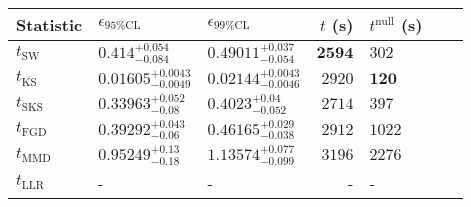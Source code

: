 \begin{tabular}{l|llr|llr}
	Statistic & $\epsilon_{95\%\mathrm{CL}}$ & $\epsilon_{99\%\mathrm{CL}}$ & $t$ (s) & $t^{\mathrm{null}}$ (s) \\
	\midrule
	$t_{\mathrm{SW}}$ & $0.414_{-0.084}^{+0.054}$ & $0.49011_{-0.054}^{+0.037}$ & ${\mathbf{2594}}$ & $302$ \\
	$t_{\overline{\mathrm{KS}}}$ & ${\mathbf{0.01605_{-0.0049}^{+0.0043}}}$ & ${\mathbf{0.02144_{-0.0046}^{+0.0043}}}$ & $2920$ & ${\mathbf{120}}$ \\
	$t_{\mathrm{SKS}}$ & $0.33963_{-0.08}^{+0.052}$ & $0.4023_{-0.052}^{+0.04}$ & $2714$ & $397$ \\
	$t_{\mathrm{FGD}}$ & $0.39292_{-0.06}^{+0.043}$ & $0.46165_{-0.038}^{+0.029}$ & $2912$ & $1022$ \\
	$t_{\mathrm{MMD}}$ & $0.95249_{-0.18}^{+0.13}$ & $1.13574_{-0.099}^{+0.077}$ & $3196$ & $2276$ \\
	$t_{\mathrm{LLR}}$ & - & - & - & - \\
	\bottomrule
\end{tabular}